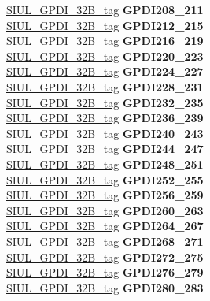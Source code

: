 \begin{DoxyCompactItemize}
\begin{tabbing}
\>\>\mbox{\hyperlink{unionSIUL__GPDI__32B__tag}{SIUL\_GPDI\_32B\_tag}} {\bfseries GPDI208\_211}\\
\>\>\mbox{\hyperlink{unionSIUL__GPDI__32B__tag}{SIUL\_GPDI\_32B\_tag}} {\bfseries GPDI212\_215}\\
\>\>\mbox{\hyperlink{unionSIUL__GPDI__32B__tag}{SIUL\_GPDI\_32B\_tag}} {\bfseries GPDI216\_219}\\
\>\>\mbox{\hyperlink{unionSIUL__GPDI__32B__tag}{SIUL\_GPDI\_32B\_tag}} {\bfseries GPDI220\_223}\\
\>\>\mbox{\hyperlink{unionSIUL__GPDI__32B__tag}{SIUL\_GPDI\_32B\_tag}} {\bfseries GPDI224\_227}\\
\>\>\mbox{\hyperlink{unionSIUL__GPDI__32B__tag}{SIUL\_GPDI\_32B\_tag}} {\bfseries GPDI228\_231}\\
\>\>\mbox{\hyperlink{unionSIUL__GPDI__32B__tag}{SIUL\_GPDI\_32B\_tag}} {\bfseries GPDI232\_235}\\
\>\>\mbox{\hyperlink{unionSIUL__GPDI__32B__tag}{SIUL\_GPDI\_32B\_tag}} {\bfseries GPDI236\_239}\\
\>\>\mbox{\hyperlink{unionSIUL__GPDI__32B__tag}{SIUL\_GPDI\_32B\_tag}} {\bfseries GPDI240\_243}\\
\>\>\mbox{\hyperlink{unionSIUL__GPDI__32B__tag}{SIUL\_GPDI\_32B\_tag}} {\bfseries GPDI244\_247}\\
\>\>\mbox{\hyperlink{unionSIUL__GPDI__32B__tag}{SIUL\_GPDI\_32B\_tag}} {\bfseries GPDI248\_251}\\
\>\>\mbox{\hyperlink{unionSIUL__GPDI__32B__tag}{SIUL\_GPDI\_32B\_tag}} {\bfseries GPDI252\_255}\\
\>\>\mbox{\hyperlink{unionSIUL__GPDI__32B__tag}{SIUL\_GPDI\_32B\_tag}} {\bfseries GPDI256\_259}\\
\>\>\mbox{\hyperlink{unionSIUL__GPDI__32B__tag}{SIUL\_GPDI\_32B\_tag}} {\bfseries GPDI260\_263}\\
\>\>\mbox{\hyperlink{unionSIUL__GPDI__32B__tag}{SIUL\_GPDI\_32B\_tag}} {\bfseries GPDI264\_267}\\
\>\>\mbox{\hyperlink{unionSIUL__GPDI__32B__tag}{SIUL\_GPDI\_32B\_tag}} {\bfseries GPDI268\_271}\\
\>\>\mbox{\hyperlink{unionSIUL__GPDI__32B__tag}{SIUL\_GPDI\_32B\_tag}} {\bfseries GPDI272\_275}\\
\>\>\mbox{\hyperlink{unionSIUL__GPDI__32B__tag}{SIUL\_GPDI\_32B\_tag}} {\bfseries GPDI276\_279}\\
\>\>\mbox{\hyperlink{unionSIUL__GPDI__32B__tag}{SIUL\_GPDI\_32B\_tag}} {\bfseries GPDI280\_283}\\

\end{tabbing}
\end{DoxyCompactItemize}
